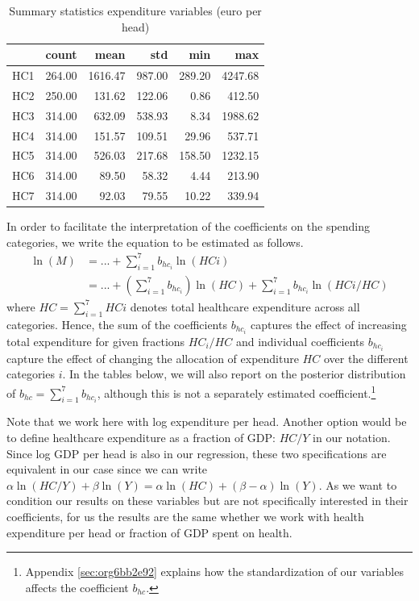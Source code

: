 \documentclass[a4paper,12pt]{article}
\begin{document}
\begin{table}[htbp]
\caption{\label{tab:summary_expenditure_variables}Summary statistics expenditure variables (euro per head)}
\centering
\begin{tabular}{lrrrrr}
 & count & mean & std & min & max\\
\hline
HC1 & 264.00 & 1616.47 & 987.00 & 289.20 & 4247.68\\
HC2 & 250.00 & 131.62 & 122.06 & 0.86 & 412.50\\
HC3 & 314.00 & 632.09 & 538.93 & 8.34 & 1988.62\\
HC4 & 314.00 & 151.57 & 109.51 & 29.96 & 537.71\\
HC5 & 314.00 & 526.03 & 217.68 & 158.50 & 1232.15\\
HC6 & 314.00 & 89.50 & 58.32 & 4.44 & 213.90\\
HC7 & 314.00 & 92.03 & 79.55 & 10.22 & 339.94\\
\end{tabular}
\end{table}

In order to facilitate the interpretation of the coefficients on the spending categories, we write the equation to be estimated as follows.
\begin{align}
\label{eq:17}
\ln(M) &= ... + \sum_{i=1}^7 b_{hc_i} \ln(HCi) \\
\label{eq:18}
 &= ... + \left(\sum_{i=1}^7 b_{hc_i} \right) \ln(HC) +  \sum_{i=1}^7 b_{hc_i} \ln(HCi/HC) 
\end{align}
where \(HC =  \sum_{i=1}^7 HCi\) denotes total healthcare expenditure across all categories. Hence, the sum of the coefficients \(b_{hc_i}\) captures the effect of increasing total expenditure for given fractions \(HC_i/HC\) and individual coefficients \(b_{hc_i}\) capture the effect of changing the allocation of expenditure \(HC\) over the different categories \(i\). In the tables below, we will also report on the posterior distribution of \(b_{hc}= \sum_{i=1}^7 b_{hc_i}\), although this is not a separately estimated coefficient.\footnote{Appendix \ref{sec:org6bb2e92} explains how the standardization of our variables affects the coefficient \(b_{hc}\).}

Note that we work here with log expenditure per head. Another option would be to define healthcare expenditure as a fraction of GDP: \(HC/Y\) in our notation. Since log GDP per head is also in our regression, these two specifications are equivalent in our case since we can write \(\alpha \ln(HC/Y) + \beta \ln(Y) = \alpha \ln(HC) + (\beta-\alpha) \ln(Y)\). As we want to condition our results on these variables but are not specifically interested in their coefficients, for us the results are the same whether we work with health expenditure per head or fraction of GDP spent on health.
\end{document}
